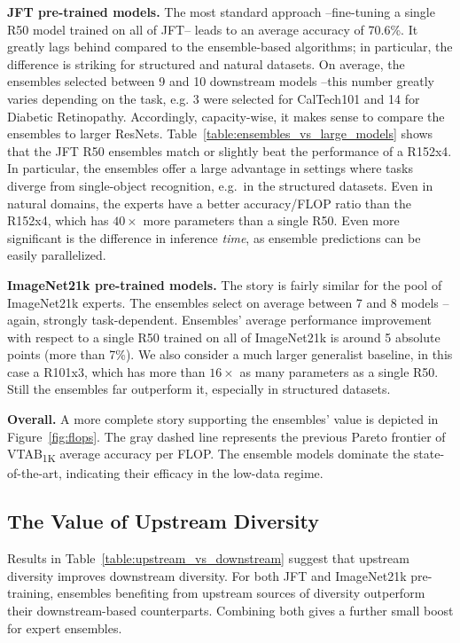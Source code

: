 \documentclass{article} \usepackage{iclr2021_conference,times}
\begin{document}
\textbf{JFT pre-trained models.} The most standard approach --fine-tuning a single R50 model trained on all of JFT-- leads to an average accuracy of 70.6\%. It greatly lags behind compared to the ensemble-based algorithms; in particular, the difference is striking for structured and natural datasets.
On average, the ensembles selected between 9 and 10 downstream models --this number greatly varies depending on the task, e.g. 3 were selected for CalTech101 and 14 for Diabetic Retinopathy.
Accordingly, capacity-wise, it makes sense to compare the ensembles to larger ResNets. 
Table~\ref{table:ensembles_vs_large_models} shows that the JFT R50 ensembles match or slightly beat the performance of a R152x4. In particular, the ensembles offer a large advantage in settings where tasks diverge from single-object recognition, e.g.\ in the structured datasets.
Even in natural domains, the experts have a better accuracy/FLOP ratio than the R152x4, which has $40\times$ more parameters than a single R50.
Even more significant is the difference in inference \emph{time}, as ensemble predictions can be easily parallelized.

\textbf{ImageNet21k pre-trained models.}
The story is fairly similar for the pool of ImageNet21k experts.
The ensembles select on average between 7 and 8 models --again, strongly task-dependent.
Ensembles' average performance improvement with respect to a single R50 trained on all of ImageNet21k is around 5 absolute points (more than 7\%).
We also consider a much larger generalist baseline, in this case a R101x3, which has more than $16\times$ as many parameters as a single R50. Still the ensembles far outperform it, especially in structured datasets.

\textbf{Overall.} A more complete story supporting the ensembles' value is depicted in Figure~\ref{fig:flops}.
The gray dashed line represents the previous Pareto frontier of VTAB\textsubscript{1K} average accuracy per FLOP. The ensemble models 
dominate the state-of-the-art, indicating their efficacy in the low-data regime.

\subsection{The Value of Upstream Diversity}
Results in Table~\ref{table:upstream_vs_downstream} suggest that upstream diversity improves downstream diversity. 
For both JFT and ImageNet21k pre-training, ensembles benefiting from upstream sources of diversity outperform their downstream-based counterparts. Combining both gives a further small boost for expert ensembles.
\end{document}
